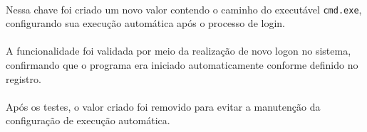 \paragraph{}
Nessa chave foi criado um novo valor contendo o caminho do executável
\texttt{cmd.exe}, configurando sua execução automática após o processo de
login.

\paragraph{}
A funcionalidade foi validada por meio da realização de novo logon no sistema,
confirmando que o programa era iniciado automaticamente conforme definido no
registro.

\paragraph{}
Após os testes, o valor criado foi removido para evitar a manutenção da
configuração de execução automática.
